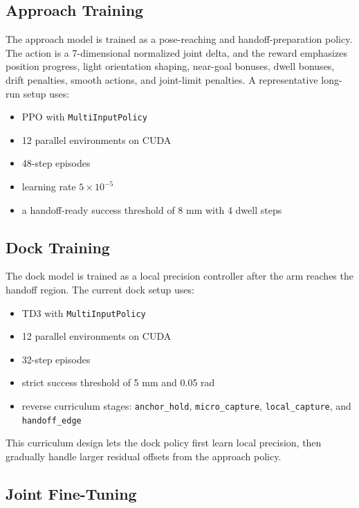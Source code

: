\documentclass[11pt]{article}
\begin{document}
\subsection{Approach Training}

The approach model is trained as a pose-reaching and handoff-preparation policy. The action is a 7-dimensional normalized joint delta, and the reward emphasizes position progress, light orientation shaping, near-goal bonuses, dwell bonuses, drift penalties, smooth actions, and joint-limit penalties. A representative long-run setup uses:
\begin{itemize}[leftmargin=1.5em]
  \item PPO with \texttt{MultiInputPolicy}
  \item 12 parallel environments on CUDA
  \item 48-step episodes
  \item learning rate \(5 \times 10^{-5}\)
  \item a handoff-ready success threshold of 8 mm with 4 dwell steps
\end{itemize}

\subsection{Dock Training}

The dock model is trained as a local precision controller after the arm reaches the handoff region. The current dock setup uses:
\begin{itemize}[leftmargin=1.5em]
  \item TD3 with \texttt{MultiInputPolicy}
  \item 12 parallel environments on CUDA
  \item 32-step episodes
  \item strict success threshold of 5 mm and 0.05 rad
  \item reverse curriculum stages: \texttt{anchor\_hold}, \texttt{micro\_capture}, \texttt{local\_capture}, and \texttt{handoff\_edge}
\end{itemize}

This curriculum design lets the dock policy first learn local precision, then gradually handle larger residual offsets from the approach policy.

\subsection{Joint Fine-Tuning}
\end{document}
